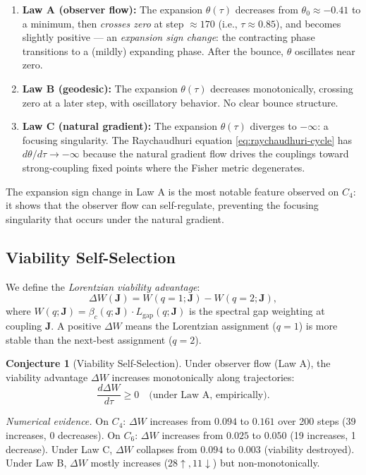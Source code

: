 \documentclass[11pt]{article}
\theoremstyle{definition}
\newtheorem{conjecture}[theorem]{Conjecture}
\theoremstyle{remark}
\newcommand{\coupl}{\mathbf{J}}
\newcommand{\expan}{\theta}
\begin{document}
\begin{enumerate}
\item \textbf{Law A (observer flow):} The expansion $\expan(\tau)$
  decreases from $\expan_0 \approx -0.41$ to a minimum, then
  \emph{crosses zero} at step $\approx 170$ (i.e., $\tau \approx 0.85$),
  and becomes slightly positive --- an \emph{expansion sign change}:
  the contracting phase transitions to a (mildly) expanding phase.
  After the bounce, $\expan$ oscillates near zero.

\item \textbf{Law B (geodesic):} The expansion $\expan(\tau)$ decreases
  monotonically, crossing zero at a later step, with oscillatory behavior.
  No clear bounce structure.

\item \textbf{Law C (natural gradient):} The expansion $\expan(\tau)$
  diverges to $-\infty$: a focusing singularity. The Raychaudhuri
  equation \eqref{eq:raychaudhuri-cycle} has $d\expan/d\tau \to -\infty$
  because the natural gradient flow drives the couplings toward strong-coupling
  fixed points where the Fisher metric degenerates.
\end{enumerate}

The expansion sign change in Law A is the most notable feature
observed on $C_4$: it shows that the observer flow can self-regulate,
preventing the focusing singularity that occurs under the natural gradient.

\subsection{Viability Self-Selection}
\label{subsec:self-selection}

We define the \emph{Lorentzian viability advantage}:
\begin{equation}
  \Delta W(\coupl) = W(q{=}1;\coupl) - W(q{=}2;\coupl),
  \label{eq:delta-w}
\end{equation}
where $W(q;\coupl) = \beta_c(q;\coupl) \cdot L_{\mathrm{gap}}(q;\coupl)$
is the spectral gap weighting at coupling $\coupl$. A positive $\Delta W$
means the Lorentzian assignment ($q = 1$) is more stable than the
next-best assignment ($q = 2$).

\begin{conjecture}[Viability Self-Selection]
\label{thm:self-selection}
Under observer flow (Law A), the viability advantage $\Delta W$
increases monotonically along trajectories:
\begin{equation}
  \frac{d\Delta W}{d\tau} \geq 0
  \quad \text{(under Law A, empirically)}.
  \label{eq:self-selection}
\end{equation}

\emph{Numerical evidence.} On $C_4$: $\Delta W$ increases from $0.094$
to $0.161$ over 200 steps (39 increases, 0 decreases).
On $C_6$: $\Delta W$ increases from $0.025$ to $0.050$
(19 increases, 1 decrease).
Under Law C, $\Delta W$ collapses from $0.094$ to $0.003$ (viability
destroyed). Under Law B, $\Delta W$ mostly increases ($28\uparrow,
11\downarrow$) but non-monotonically.
\end{conjecture}
\end{document}
